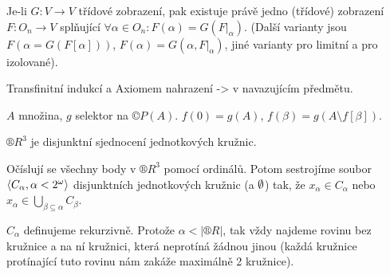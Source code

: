 \documentclass[12pt]{article}                   %
\begin{document}
    \begin{veta}
        Je-li $G: V \rightarrow V$ třídové zobrazení, pak existuje právě jedno (třídové) zobrazení $F: O_n \rightarrow V$ splňující $\forall \alpha \in O_n: F(\alpha) = G(F|_\alpha)$. (Další varianty jsou $F(\alpha = G(F[\alpha]))$, $F(\alpha) = G(\alpha, F|_\alpha)$, jiné varianty pro limitní a pro izolované).

        \begin{dukazin}
            Transfinitní indukcí a Axiomem nahrazení -> v navazujícím předmětu.
        \end{dukazin}
    \end{veta}

    \begin{dukazin}
        $A$ množina, $g$ selektor na $©P(A)$. $f(0) = g(A)$, $f(\beta) = g(A \setminus f[\beta])$.
    \end{dukazin}

    \begin{priklad}
        $®R^3$ je disjunktní sjednocení jednotkových kružnic.

        \begin{dukazin}
            Očíslují se všechny body v $®R^3$ pomocí ordinálů. Potom sestrojíme soubor $\left\langle C_\alpha, \alpha < 2^{\omega}\right\rangle$ disjunktních jednotkových kružnic (a $\emptyset$) tak, že $x_\alpha \in C_\alpha$ nebo $x_\alpha \in \bigcup_{\beta \subseteq \alpha} C_\beta$.

            $C_\alpha$ definujeme rekurzivně. Protože $\alpha < |®R|$, tak vždy najdeme rovinu bez kružnice a na ní kružnici, která neprotíná žádnou jinou (každá kružnice protínající tuto rovinu nám zakáže maximálně 2 kružnice).
        \end{dukazin}
    \end{priklad}
\end{document}
